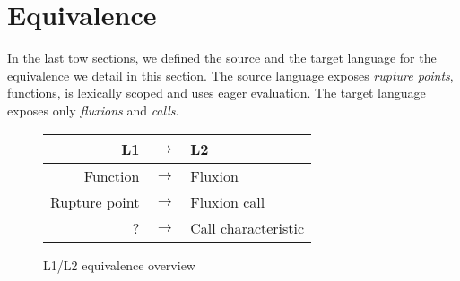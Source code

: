 \section{Equivalence} \label{equivalence}









In the last tow sections, we defined the source and the target language for the equivalence we detail in this section.
The source language exposes \textit{rupture points}, functions, is lexically scoped and uses eager evaluation.
The target language exposes only \textit{fluxions} and \textit{calls}.

\begin{figure}\label{fig:equivalence}
\begin{center}
\begin{tabular}{r c l}
L1             & \small{$\to$} &  L2 \\ \hline
Function       & \small{$\to$} &  Fluxion \\
Rupture point  & \small{$\to$} &  Fluxion call \\
?              & \small{$\to$} &  Call characteristic \\
\end{tabular}
\end{center}
\caption{L1/L2 equivalence overview}
\end{figure}

